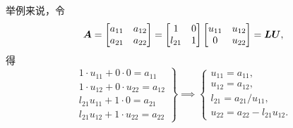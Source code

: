 举例来说，令\begin{equation*}
	\boldsymbol{A} = \begin{bmatrix}
		a_{11} & a_{12} \\
		a_{21} & a_{22}
	\end{bmatrix}
	= \begin{bmatrix}
		1 & 0 \\
		l_{21} & 1
	\end{bmatrix}
	\begin{bmatrix}
		u_{11} & u_{12} \\
		0 & u_{22}
	\end{bmatrix}
	= \boldsymbol{L} \boldsymbol{U},
\end{equation*}
得\begin{equation*}
	\left.\begin{array}{r}
		1 \cdot u_{11} + 0 \cdot 0 = a_{11} \\
		1 \cdot u_{12} + 0 \cdot u_{22} = a_{12} \\
		l_{21} u_{11} + 1 \cdot 0 = a_{21} \\
		l_{21} u_{12} + 1 \cdot u_{22} = a_{22}
	\end{array}\right\}
	\implies
	\left\{\begin{array}{l}
		u_{11} = a_{11}, \\
		u_{12} = a_{12}, \\
		l_{21} = a_{21} / u_{11}, \\
		u_{22} = a_{22} - l_{21} u_{12}.
	\end{array}\right.
\end{equation*}

